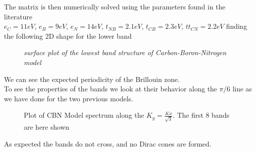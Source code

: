 \documentclass[a4paper]{article}
\begin{document}
The matrix is then numerically solved using the parameters found in the literature\\
$e_{C}=11eV$, $e_{B}=9eV$, $e_{N}=14eV$, $t_{NB}=2.1eV$, $t_{CB}=2.3eV$, $tt_{CN}=2.2eV$
 finding the following 2D shape for the lower band

\begin{figure}[h]
\centering
\caption{\label{3dcbn} \it surface plot of the lowest band structure of Carbon-Boron-Nitrogen model}
\end{figure}

We can see the expected periodicity of the Brillouin zone.\\ 
To see the properties of the bands we look at their behavior along the $\pi/6$ line as we have done for the two previous models.

\begin{figure}[h!]
\centering
\caption{\label{ebands_cbn}Plot of CBN Model spectrum along the $K_{y}=\frac{K{x}}{\sqrt{3}}$. The first 8 bands are here shown}
\end{figure}

As expected the bands do not cross, and no Dirac cones are formed.

%
%
\end{document}
